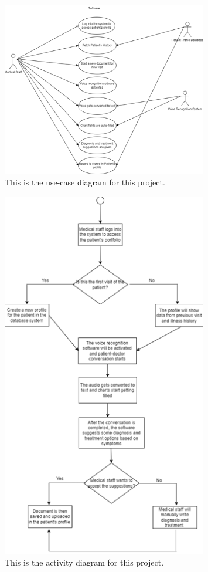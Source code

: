 \documentclass[12pt]{article}
\begin{document}
\begin{figure}[h]
  \centering
  \includegraphics[width=0.8\textwidth]{use_case_diag.png}
  \caption{This is the use-case diagram for this project.}
  \label{fig:Use-Case Diagram}
\end{figure}

\begin{figure}[h]
  \centering
  \includegraphics[width=0.8\textwidth]{activity_diag.png}
  \caption{This is the activity diagram for this project.}
  \label{fig:Activity Diagram}
\end{figure}
\end{document}
